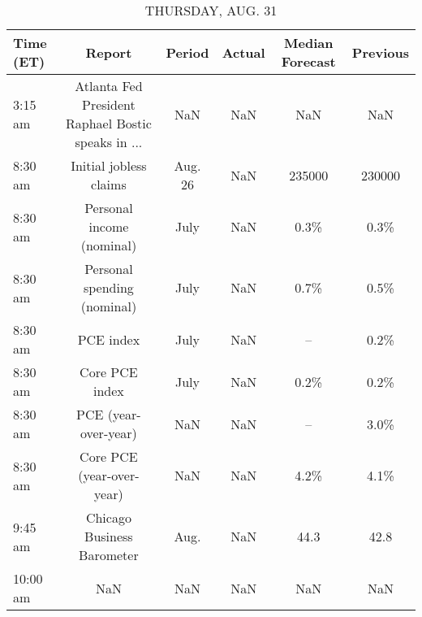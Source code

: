 \documentclass{article}%
\begin{document}
\begin{table}[htbp]%
\caption{THURSDAY, AUG. 31}%
\centering%
\begin{adjustbox}{width=1\textwidth}%
\begin{tabular}{lccccc}
\toprule
Time (ET) &                                             Report &  Period & Actual & Median Forecast & Previous \\
\midrule
  3:15 am & Atlanta Fed President Raphael Bostic speaks in ... &     NaN &    NaN &             NaN &      NaN \\
  8:30 am &                             Initial jobless claims & Aug. 26 &    NaN &          235000 &   230000 \\
  8:30 am &                          Personal income (nominal) &    July &    NaN &            0.3\% &     0.3\% \\
  8:30 am &                        Personal spending (nominal) &    July &    NaN &            0.7\% &     0.5\% \\
  8:30 am &                                          PCE index &    July &    NaN &              -- &     0.2\% \\
  8:30 am &                                     Core PCE index &    July &    NaN &            0.2\% &     0.2\% \\
  8:30 am &                               PCE (year-over-year) &     NaN &    NaN &              -- &     3.0\% \\
  8:30 am &                          Core PCE (year-over-year) &     NaN &    NaN &            4.2\% &     4.1\% \\
  9:45 am &                         Chicago Business Barometer &    Aug. &    NaN &            44.3 &     42.8 \\
 10:00 am &                                                NaN &     NaN &    NaN &             NaN &      NaN \\
\bottomrule
\end{tabular}
%
\end{adjustbox}%
\end{table}

%
\end{document}
